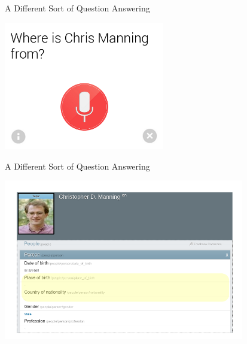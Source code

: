 \def\title{A Different Sort of Question Answering}
\begin{frame}{\title}
\begin{center}
  \includegraphics[width=7cm]{../img/google-chris-manning-origin.png}
\end{center}
\end{frame}

\begin{frame}[noframenumbering]{\title}
\vspace{-1cm}
\begin{center}
  \includegraphics[width=10.5cm]{../img/chris-freebase.png}
\end{center}
\end{frame}

